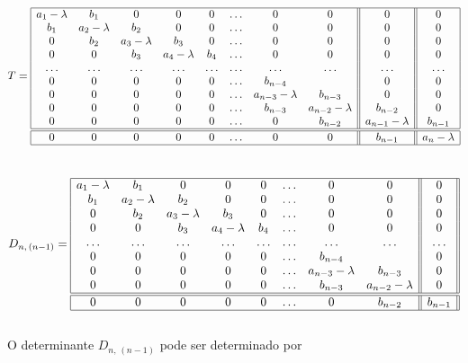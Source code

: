 \[
 T =
 \begin{array}{|cccccccc||c||c|}
  \hline
  a_1 - \lambda & b_1 & 0 & 0 & 0 & \ldots & 0 & 0 & 0 & 0\\
  b_1 & a_2 - \lambda & b_2 & 0 & 0 & \ldots & 0 & 0 & 0 & 0\\
  0   & b_2 & a_3 - \lambda & b_3 & 0 & \ldots & 0 & 0 & 0 & 0\\
  0   & 0 & b_3 & a_4 - \lambda & b_4 & \ldots & 0 & 0 & 0 & 0\\
  \ldots & \ldots & \ldots & \ldots & \ldots & \ldots & \ldots & \ldots & \ldots & \ldots\\
  0 & 0 & 0 & 0 & 0 & \ldots & b_{n-4} & & 0 & 0\\
  0 & 0 & 0 & 0 & 0 & \ldots & a_{n-3} - \lambda & b_{n-3} & 0 & 0\\
  0 & 0 & 0 & 0 & 0 & \ldots & b_{n-3} & a_{n-2} - \lambda & b_{n-2} & 0\\
  0 & 0 & 0 & 0 & 0 & \ldots & 0 & b_{n-2} & a_{n-1} - \lambda & b_{n-1}\\
  \hline
  \hline
  0 & 0 & 0 & 0 & 0 & \ldots & 0 & 0 & b_{n-1} & a_n - \lambda\\
  \hline
 \end{array}
\]\\

\[
 D_{n, \, (n-1)} =
 \begin{array}{|cccccccc||c||}
  \hline
  a_1 - \lambda & b_1 & 0 & 0 & 0 & \ldots & 0 & 0 & 0\\
  b_1 & a_2 - \lambda & b_2 & 0 & 0 & \ldots & 0 & 0 & 0\\
  0   & b_2 & a_3 - \lambda & b_3 & 0 & \ldots & 0 & 0 & 0\\
  0   & 0 & b_3 & a_4 - \lambda & b_4 & \ldots & 0 & 0 & 0\\
  \ldots & \ldots & \ldots & \ldots & \ldots & \ldots & \ldots & \ldots & \ldots\\
  0 & 0 & 0 & 0 & 0 & \ldots & b_{n-4} & & 0\\
  0 & 0 & 0 & 0 & 0 & \ldots & a_{n-3} - \lambda & b_{n-3} & 0\\
  0 & 0 & 0 & 0 & 0 & \ldots & b_{n-3} & a_{n-2} - \lambda & 0\\
  \hline
  \hline
  0 & 0 & 0 & 0 & 0 & \ldots & 0 & b_{n-2} & b_{n-1}\\
  \hline
 \end{array}
\]\\

O determinante $ D_{n, \, (n-1)} $ pode ser determinado por

